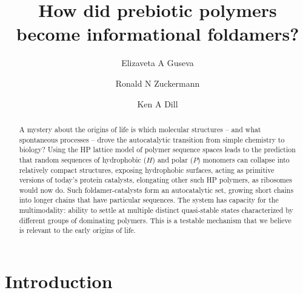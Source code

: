 \documentclass[twocolumn,letterpaper]{revtex4-1}
\begin{document}
\title{How did prebiotic polymers become informational foldamers?}

\author{Elizaveta A Guseva}


\author{Ronald N Zuckermann}
\author{Ken A Dill}





\begin{abstract}
A mystery about the origins of life is which molecular structures -- and what spontaneous 
processes -- drove the autocatalytic transition from simple chemistry to biology?  Using the HP 
lattice model of polymer sequence spaces leads to the prediction that random sequences of 
hydrophobic ($H$) and 
polar ($P$) monomers can collapse into relatively compact structures, exposing hydrophobic 
surfaces, acting as primitive versions of today's protein catalysts, elongating other such HP 
polymers, as ribosomes would now do. Such foldamer-catalysts form an autocatalytic set, growing 
short chains into longer chains that have particular sequences. The system has capacity for the 
multimodality: ability to settle at multiple distinct 
quasi-stable states characterized by different groups of dominating polymers. This is a testable 
mechanism that we believe is relevant to the early origins of life.
\end{abstract}

\maketitle

\section*{Introduction} 
\end{document}
